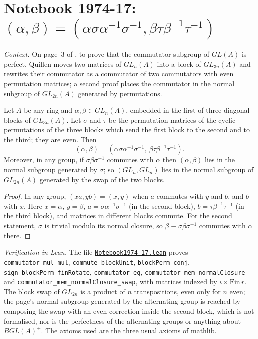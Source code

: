 \section[Notebook 1974-17: the commutator trick of the Whitehead lemma]{Notebook 1974-17: $(\alpha, \beta) = (\alpha\sigma\alpha^{-1}\sigma^{-1}, \beta\tau\beta^{-1}\tau^{-1})$\protect{}}\label{sec:quillen-1974-17}

\emph{Context.} On page~3 of , to prove that the commutator subgroup of $GL(A)$ is perfect, Quillen moves two matrices of $GL_n(A)$ into a block of $GL_{3n}(A)$ and rewrites their commutator as a commutator of two commutators with even permutation matrices; a second proof places the commutator in the normal subgroup of $GL_{2n}(A)$ generated by permutations.

\begin{encadre}
\begin{theoreme}\label{thm:quillen-1974-17}
Let $A$ be any ring and $\alpha, \beta \in GL_n(A)$, embedded in the first of three diagonal blocks of $GL_{3n}(A)$. Let $\sigma$ and $\tau$ be the permutation matrices of the cyclic permutations of the three blocks which send the first block to the second and to the third; they are even. Then
\[
(\alpha, \beta) = (\alpha\sigma\alpha^{-1}\sigma^{-1},\ \beta\tau\beta^{-1}\tau^{-1}).
\]
Moreover, in any group, if $\sigma\beta\sigma^{-1}$ commutes with $\alpha$ then $(\alpha, \beta)$ lies in the normal subgroup generated by $\sigma$; so $(GL_n, GL_n)$ lies in the normal subgroup of $GL_{2n}(A)$ generated by the swap of the two blocks.
\end{theoreme}
\end{encadre}

\begin{proof}
In any group, $(xa, yb) = (x, y)$ when $a$ commutes with $y$ and $b$, and $b$ with $x$. Here $x = \alpha$, $y = \beta$, $a = \sigma\alpha^{-1}\sigma^{-1}$ (in the second block), $b = \tau\beta^{-1}\tau^{-1}$ (in the third block), and matrices in different blocks commute. For the second statement, $\sigma$ is trivial modulo its normal closure, so $\beta \equiv \sigma\beta\sigma^{-1}$ commutes with $\alpha$ there.
\end{proof}

\emph{Verification in Lean.} The file \href{\leanblobmain/Notebook1974_17.lean}{\texttt{Notebook1974\_17.\allowbreak{}lean}} proves \texttt{commutator\_mul\_mul}, \texttt{commute\_blockUnit}, \texttt{blockPerm\_conj}, \texttt{sign\_blockPerm\_finRotate}, \texttt{commutator\_eq}, \texttt{commutator\_mem\_normalClosure} and \texttt{commutator\_mem\_normalClosure\_swap}, with matrices indexed by $\iota \times \mathrm{Fin}\,r$. The block swap of $GL_{2n}$ is a product of $n$ transpositions, even only for $n$ even; the page's normal subgroup generated by the alternating group is reached by composing the swap with an even correction inside the second block, which is not formalised, nor is the perfectness of the alternating groups or anything about $BGL(A)^+$. The axioms used are the three usual axioms of mathlib.

